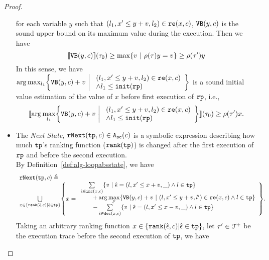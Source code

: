 \begin{proof}
\begin{itemize}
 for each variable $y$ such that $(l_1, x' \leq y + v, l_2) \in \mathtt{re}(x, c) $,
 ${\mathtt{VB}}(y, c)$ is the sound upper bound on its maximum value during the execution. Then we have
 \[
   \econfig{\varinvar(y, c)}(\trace_0) \geq \max \left\{ v ~|~  \env(\trace) y = v \right\}  \geq \env(\trace') y 
 \]
%
 In this sense, we have 
 $
 \arg\max_{l_1}\left\{
  \varinvar(y, c) + v ~\middle\vert~ 
  \begin{array}{l} 
    (l_1, x' \leq y + v, l_2) \in \reset(x, c) \\
    \land l_1 \leq \absinit(\rprog)
\end{array}
\right\}
 $
 is a sound initial value estimation of the value of $x$ before first execution of $\mathtt{rp}$, i.e.,
 \[
   \econfig{\arg\max_{l_1}\left\{
    \varinvar(y, c) + v ~\middle\vert~ 
    \begin{array}{l} 
      (l_1, x' \leq y + v, l_2) \in \reset(x, c) \\
      \land l_1 \leq \absinit(\rprog)
  \end{array}
  \right\}}(\trace_0) 
   \geq \env(\trace') x.
   \]
 \item  
 The \emph{Next State}, $\mathtt{rNext}(\mathtt{tp}, c) \in {\ensuremath{\mathtt{A_{sc}}}}(c)$ 
 is a
 symbolic expression describing how much $\mathtt{tp}$'s ranking function ($\mathtt{rank}(\mathtt{tp})$) is changed after the first execution of $\mathtt{rp}$ and before the second execution.
\\
 By Definition~\ref{def:alg-loopabsstate}, we have
 \[
   \begin{array}{l}
   \rfnext(\tpath, c) \triangleq 
   \\
   \bigcup\limits_{x \in \left\{ \locbound(\absevent, c) | \absevent \in \tpath \right\}}
   \left\{ x = \begin{array}{l}
  \sum\limits_{\absevent \in \inc(x, c) }
   \left\{ v ~\middle\vert~ \absevent = (l, x' \leq x + v, \_) \land l \in \tpath\right\}
   \\ \qquad 
   + \arg\max\limits_{l' }
      \left\{ \varinvar(y, c) + v ~\middle\vert~ (l, x' \leq y + v, l') \in \reset(x, c) \land l \in \tpath\right\}
      \\ \qquad 
     - \sum\limits_{ \absevent \in \dec(x, c) }\left\{ 
       v ~\middle\vert~ \absevent = (l, x' \leq x - v, \_) \land l \in \tpath 
       \right\}
     \end{array}
   \right\}.
   \end{array}
 \]
 Taking an arbitrary ranking function $x \in \left\{ \locbound(\absevent, c) | \absevent \in \tpath \right\}$,
 let $\mathtt{\tau}' \in \mathcal{T}^{+}$ be the execution trace before the second execution of $\mathtt{tp}$, we have

\end{itemize}
\end{proof}
